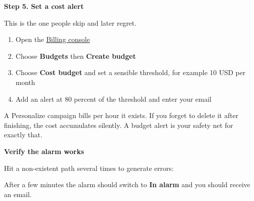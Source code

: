 \vspace{0.5em}\noindent\textbf{Step 5. Set a cost alert}\par

This is the one people skip and later regret.

\begin{enumerate}
\def\labelenumi{\arabic{enumi}.}
\tightlist
\item
  Open the
  \href{https://console.aws.amazon.com/billing/home\#/budgets}{Billing
  console}
\item
  Choose \textbf{Budgets} then \textbf{Create budget}
\item
  Choose \textbf{Cost budget} and set a sensible threshold, for example
  10 USD per month
\item
  Add an alert at 80 percent of the threshold and enter your email
\end{enumerate}

A Personalize campaign bills per hour it exists. If you forget to delete
it after finishing, the cost accumulates silently. A budget alert is
your safety net for exactly that.

\vspace{0.5em}\noindent\textbf{Verify the alarm works}\par

Hit a non-existent path several times to generate errors:

\begin{Shaded}
\begin{Highlighting}[]
 \DataTypeTok{\{}\DataTypeTok{\}}\KeywordTok{;} 
   \OperatorTok{\textgreater{}}
\end{Highlighting}
\end{Shaded}

After a few minutes the alarm should switch to \textbf{In alarm} and you
should receive an email.
